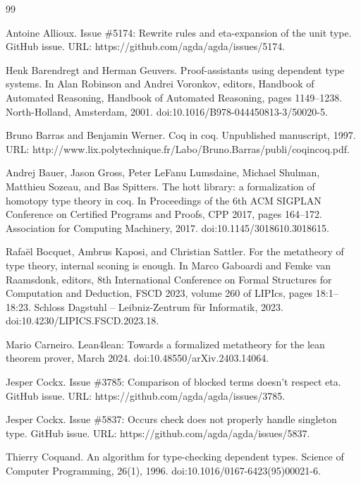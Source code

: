 \documentclass[10pt,a4paper]{amsart}
\begin{document}
\begin{thebibliography}{99}
\par\noindent  [8]  Antoine Allioux.  Issue \#5174: Rewrite rules and eta-expansion of the unit type.  GitHub issue.  URL: https://github.com/agda/agda/issues/5174.  
 
\par\noindent  [9]  Henk Barendregt and Herman Geuvers.  Proof-assistants using dependent type systems.  In Alan Robinson and Andrei Voronkov, editors, Handbook of Automated Reasoning, Handbook of Automated Reasoning, pages 1149–1238. North-Holland, Amsterdam, 2001.  doi:10.1016/B978-044450813-3/50020-5.  
 
\par\noindent  [10]  Bruno Barras and Benjamin Werner.  Coq in coq.  Unpublished manuscript, 1997.  URL: http://www.lix.polytechnique.fr/Labo/Bruno.Barras/publi/coqincoq.pdf.  
 
\par\noindent  [11]  Andrej Bauer, Jason Gross, Peter LeFanu Lumsdaine, Michael Shulman, Matthieu Sozeau, and Bas Spitters.  The hott library: a formalization of homotopy type theory in coq.  In Proceedings of the 6th ACM SIGPLAN Conference on Certified Programs and Proofs, CPP 2017, pages 164–172. Association for Computing Machinery, 2017.  doi:10.1145/3018610.3018615.  
 
\par\noindent  [12]  Rafaël Bocquet, Ambrus Kaposi, and Christian Sattler.  For the metatheory of type theory, internal sconing is enough.  In Marco Gaboardi and Femke van Raamsdonk, editors, 8th International Conference on Formal Structures for Computation and Deduction, FSCD 2023, volume 260 of LIPIcs, pages 18:1–18:23. Schloss Dagstuhl – Leibniz-Zentrum für Informatik, 2023.  doi:10.4230/LIPICS.FSCD.2023.18.  
 
\par\noindent  [13]  Mario Carneiro.  Lean4lean: Towards a formalized metatheory for the lean theorem prover, March 2024.  doi:10.48550/arXiv.2403.14064.  
 
\par\noindent  [14]  Jesper Cockx.  Issue \#3785: Comparison of blocked terms doesn’t respect eta.  GitHub issue.  URL: https://github.com/agda/agda/issues/3785.  
 
\par\noindent  [15]  Jesper Cockx.  Issue \#5837: Occurs check does not properly handle singleton type.  GitHub issue.  URL: https://github.com/agda/agda/issues/5837.  
 
\par\noindent  [16]  Thierry Coquand.  An algorithm for type-checking dependent types.  Science of Computer Programming, 26(1), 1996.  doi:10.1016/0167-6423(95)00021-6.  
 

\end{thebibliography}
\end{document}
